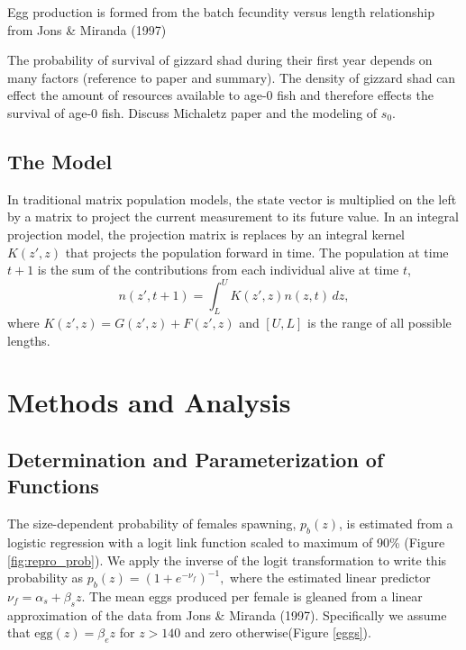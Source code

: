 \documentclass[11pt,oneside]{amsart}
\theoremstyle{definition}
\begin{document}
Egg production is formed from the batch fecundity versus length relationship from Jons \& Miranda (1997)

The probability of survival of gizzard shad during their first year depends on many factors (reference to paper and summary).  The density of gizzard shad can effect the amount of resources available to age-0 fish and therefore effects the survival of age-0 fish. Discuss Michaletz paper and the modeling of $s_0$.

\subsection{The Model} 
In traditional matrix population models, the state vector is multiplied on the left by a matrix to project the current measurement to its future value.  In an integral projection model, the projection matrix is replaces by an integral kernel $K(z',z)$ that projects the population forward in time.  The population at time $t+1$ is the sum of the contributions from each individual alive at time $t$,
\begin{equation}\label{eq:IPM}
n(z',t+1) = \int_L^U K(z',z)n(z,t) \,dz,
\end{equation}  
where $K(z',z) = G(z',z) + F(z',z)$ and $[U,L]$ is the range of all possible lengths.

\section{Methods and Analysis}
\subsection{Determination and Parameterization of Functions}
The size-dependent probability of females spawning, $p_b(z)$, is estimated from a logistic regression with a logit link function scaled to maximum of 90\% (Figure \ref{fig:repro_prob}). We apply the inverse of the logit transformation to write this probability as $p_b(z) = (1+e^{-\nu_f})^{-1},$ where the estimated linear predictor $\nu_f = \alpha_s + \beta_s z$.  The mean eggs produced per female is gleaned from a linear approximation of the data from Jons \& Miranda (1997).  Specifically we assume that $\mbox{egg}(z) = \beta_e z$ for $z>140$ and zero otherwise(Figure \ref{eggs}). 
\end{document}
